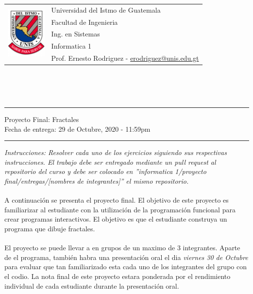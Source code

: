 \documentclass{article}
\newcommand{\horrule}[1]{\rule{\linewidth}{#1}}
\begin{document}
\begin{tabular}{l l}
\multirow{5}{*}{\includegraphics[width=2cm]{../recursos/logo.png}} & Universidad del Istmo de Guatemala \\
 & Facultad de Ingenieria \\
 & Ing. en Sistemas \\
 & Informatica 1 \\
 & Prof. Ernesto Rodriguez - \href{mailto:erodriguez@unis.edu.gt}{erodriguez@unis.edu.gt} \\
\end{tabular}
\\\\\\

\begin{center}
        \horrule{0.5pt}
        \huge{Proyecto Final: Fractales} \\
        \large{Fecha de entrega: 29 de Octubre, 2020 - 11:59pm} \\
        \horrule{1pt}
\end{center}

\emph{Instrucciones: Resolver cada uno de los ejercicios siguiendo sus respectivas
instrucciones. El trabajo debe ser entregado mediante un pull request al repositorio
del curso y debe ser colocado en ''informatica 1/proyecto final/entregas/[nombres de integrantes]''
el mismo repositorio. }
\\\\
A continuaci\'on se presenta el proyecto final. El objetivo de este proyecto es familiarizar al
estudiante con la utilizaci\'on de la programaci\'on funcional para crear programas interactivos.
El objetivo es que el estudiante construya un programa que dibuje fractales.
\\\\
El proyecto se puede llevar a en grupos de un maximo de 3 integrantes. Aparte de el programa,
tambi\'en habra una presentaci\'on oral el dia \emph{viernes 30 de Octubre} para evaluar que
tan familiarizado esta cada uno de los integrantes del grupo con el codio. La nota final de
este proyecto estara ponderada por el rendimiento individual de cada estudiante durante la
presentaci\'on oral.
\end{document}
